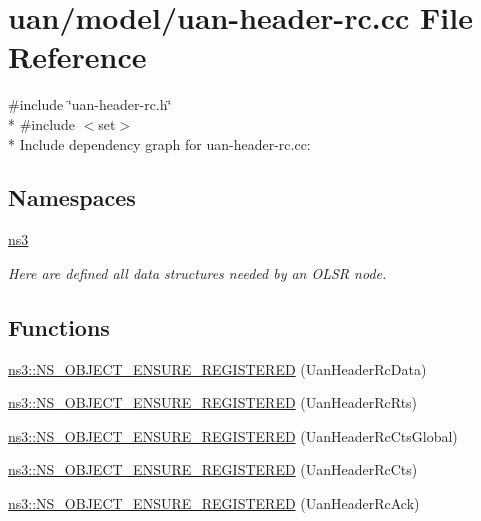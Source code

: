 \hypertarget{uan-header-rc_8cc}{}\section{uan/model/uan-\/header-\/rc.cc File Reference}
\label{uan-header-rc_8cc}
{\ttfamily \#include \char`\"{}uan-\/header-\/rc.\+h\char`\"{}}\\*
{\ttfamily \#include $<$set$>$}\\*
Include dependency graph for uan-\/header-\/rc.cc\+:
\subsection*{Namespaces}
\begin{DoxyCompactItemize}
\item 
 \hyperlink{namespacens3}{ns3}
\begin{DoxyCompactList}\small\item\em Here are defined all data structures needed by an O\+L\+SR node. \end{DoxyCompactList}\end{DoxyCompactItemize}
\subsection*{Functions}
\begin{DoxyCompactItemize}
\item 
\hyperlink{namespacens3_a743808340e9fcd2cffb690f12c475d9a}{ns3\+::\+N\+S\+\_\+\+O\+B\+J\+E\+C\+T\+\_\+\+E\+N\+S\+U\+R\+E\+\_\+\+R\+E\+G\+I\+S\+T\+E\+R\+ED} (Uan\+Header\+Rc\+Data)
\item 
\hyperlink{namespacens3_acfc96c4140f4718592cd7718dc06fd9d}{ns3\+::\+N\+S\+\_\+\+O\+B\+J\+E\+C\+T\+\_\+\+E\+N\+S\+U\+R\+E\+\_\+\+R\+E\+G\+I\+S\+T\+E\+R\+ED} (Uan\+Header\+Rc\+Rts)
\item 
\hyperlink{namespacens3_afa4894137db8b982d4052903c93b26da}{ns3\+::\+N\+S\+\_\+\+O\+B\+J\+E\+C\+T\+\_\+\+E\+N\+S\+U\+R\+E\+\_\+\+R\+E\+G\+I\+S\+T\+E\+R\+ED} (Uan\+Header\+Rc\+Cts\+Global)
\item 
\hyperlink{namespacens3_a10c08f763fa801c362b2b9b89633e6fd}{ns3\+::\+N\+S\+\_\+\+O\+B\+J\+E\+C\+T\+\_\+\+E\+N\+S\+U\+R\+E\+\_\+\+R\+E\+G\+I\+S\+T\+E\+R\+ED} (Uan\+Header\+Rc\+Cts)
\item 
\hyperlink{namespacens3_a3ea1a5fb38647de448390f82ff925a6c}{ns3\+::\+N\+S\+\_\+\+O\+B\+J\+E\+C\+T\+\_\+\+E\+N\+S\+U\+R\+E\+\_\+\+R\+E\+G\+I\+S\+T\+E\+R\+ED} (Uan\+Header\+Rc\+Ack)
\end{DoxyCompactItemize}
